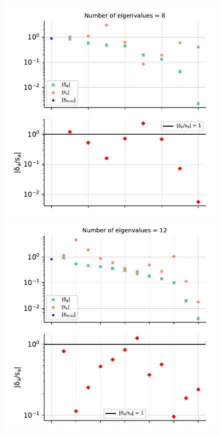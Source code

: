 \begin{figure}[ht!]
  \begin{center}
    \includegraphics[scale=0.6]{mhous/plots/projector_eigenvalue_ratio_5pt_global.pdf}
    \includegraphics[scale=0.6]{mhous/plots/projector_eigenvalue_ratio_5barpt_global.pdf}

\end{center}
\end{figure}

